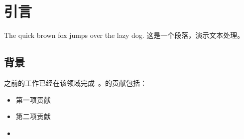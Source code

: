\section{引言}
\label{sec:intro}

The quick brown fox jumps over the lazy dog. 这是一个段落，演示文本处理。

\subsection{背景}
\label{subsec:background}

之前的工作已经在该领域完成~\cite{ref2021}。的贡献包括：
\begin{itemize}
    \item 第一项贡献
    \item 第二项贡献
    \item {}
\end{itemize}